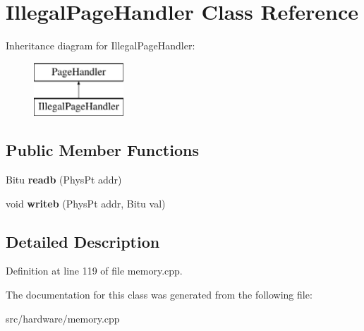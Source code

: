 \hypertarget{classIllegalPageHandler}{\section{Illegal\-Page\-Handler Class Reference}
\label{classIllegalPageHandler}
}
Inheritance diagram for Illegal\-Page\-Handler\-:\begin{figure}[H]
\begin{center}
\leavevmode
\includegraphics[height=2.000000cm]{classIllegalPageHandler}
\end{center}
\end{figure}
\subsection*{Public Member Functions}
\begin{DoxyCompactItemize}
\item 
\hypertarget{classIllegalPageHandler_a76f1d0cf8cacaa7a54d9cd87dcd77aa3}{Bitu {\bfseries readb} (Phys\-Pt addr)}\label{classIllegalPageHandler_a76f1d0cf8cacaa7a54d9cd87dcd77aa3}

\item 
\hypertarget{classIllegalPageHandler_a061eb7abdb84d8bc85d8c83fecbe371e}{void {\bfseries writeb} (Phys\-Pt addr, Bitu val)}\label{classIllegalPageHandler_a061eb7abdb84d8bc85d8c83fecbe371e}

\end{DoxyCompactItemize}


\subsection{Detailed Description}


Definition at line 119 of file memory.\-cpp.



The documentation for this class was generated from the following file\-:\begin{DoxyCompactItemize}
\item 
src/hardware/memory.\-cpp\end{DoxyCompactItemize}
